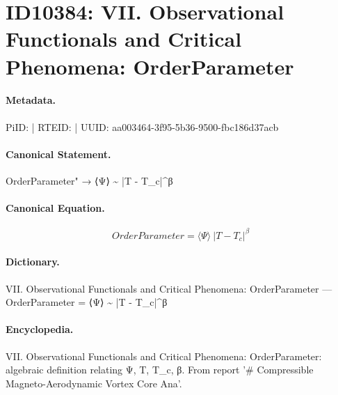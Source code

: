 \section*{ID10384: VII. Observational Functionals and Critical Phenomena: OrderParameter}
\paragraph{Metadata.}
PiID:  | RTEID:  | UUID: aa003464-3f95-5b36-9500-fbc186d37acb

\paragraph{Canonical Statement.}
OrderParameter" → ⟨Ψ⟩ \textasciitilde{} |T - T\_c|\textasciicircum{}β

\paragraph{Canonical Equation.}
\[
OrderParameter = ⟨Ψ⟩ ~ |T - T_c|^β
\]

\paragraph{Dictionary.}
VII. Observational Functionals and Critical Phenomena: OrderParameter — OrderParameter = ⟨Ψ⟩ \textasciitilde{} |T - T\_c|\textasciicircum{}β

\paragraph{Encyclopedia.}
VII. Observational Functionals and Critical Phenomena: OrderParameter: algebraic definition relating Ψ, T, T\_c, β. From report '\# Compressible Magneto-Aerodynamic Vortex Core Ana'.
